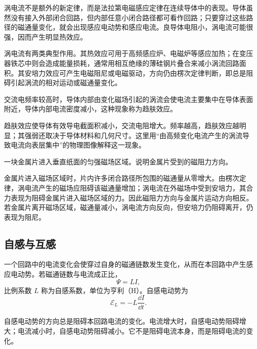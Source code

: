 涡电流不是额外的新定律，而是法拉第电磁感应定律在连续导体中的表现。导体虽然没有接入外部闭合回路，但内部任意小闭合路径都可看作回路；只要穿过这些路径的磁通量变化，就会出现感应电动势和感应电流。良导体电阻小，涡电流可能很强，因而产生明显热效应。

\begin{attention}[涡电流的作用]
涡电流有两类典型作用。其热效应可用于高频感应炉、电磁炉等感应加热；在变压器铁芯中则会造成能量损耗，通常用相互绝缘的薄硅钢片叠合来减小涡流回路面积。其安培力效应可产生电磁阻尼或电磁驱动，方向仍由楞次定律判断，即总是阻碍引起涡流的相对运动或磁通量变化。
\end{attention}

\begin{definition}[趋肤效应]\label{def:skin-effect}
交流电频率较高时，导体内部由变化磁场引起的涡流会使电流主要集中在导体表面附近，导体内部电流密度减小，这种现象称为趋肤效应。
\end{definition}

趋肤效应使导体有效导电截面积减小，交流电阻增大。频率越高，趋肤效应越明显；其强弱还取决于导体材料和几何尺寸。这里用“由高频变化电流产生的涡流导致电流向表层集中”的物理图像解释这一现象。

\begin{example}[title={电磁阻尼方向判断}]\label{eg:magnetic-damping}
一块金属片进入垂直纸面的匀强磁场区域。说明金属片受到的磁阻力方向。
\begin{solution}
金属片进入磁场区域时，片内许多闭合路径所包围的磁通量从零增大。由楞次定律，涡电流产生的磁场应阻碍该磁通量增加；涡电流在外磁场中受到安培力，其合力表现为阻碍金属片进入磁场区域的力。因此磁阻力方向与金属片运动方向相反。若金属片离开磁场区域，磁通量减小，涡电流方向反向，但安培力仍阻碍离开，仍表现为阻尼。
\end{solution}
\end{example}

\subsection{自感与互感}

\begin{definition}[自感]\label{def:self-inductance}
一个回路中的电流变化会使穿过自身的磁通链数发生变化，从而在本回路中产生感应电动势。若磁通链数与电流成正比，
\[
  \Psi=LI,
\]
比例系数 $L$ 称为自感系数，单位为亨利（H）。自感电动势为
\[
  \mathcal E_L=-L\frac{\dd I}{\dd t}.
\]
\end{definition}

自感电动势的方向总是阻碍本回路电流的变化。电流增大时，自感电动势阻碍增大；电流减小时，自感电动势阻碍减小。它不是阻碍电流本身，而是阻碍电流的变化。

